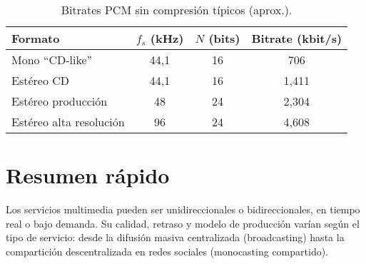 \documentclass[11pt,a4paper]{article}
\begin{document}
\begin{table}[h!]
\centering
\begin{tabular}{lccc}
\hline
\textbf{Formato} & $f_s$ (kHz) & $N$ (bits) & \textbf{Bitrate} (kbit/s) \\
\hline
Mono ``CD-like''     & 44{,}1 & 16 & 706 \\
Estéreo CD           & 44{,}1 & 16 & 1{,}411 \\
Estéreo producción   & 48     & 24 & 2{,}304 \\
Estéreo alta resolución & 96  & 24 & 4{,}608 \\
\hline
\end{tabular}
\caption{Bitrates PCM sin compresión típicos (aprox.).}
\end{table}


\section{Resumen rápido}

\begin{ResumenBox}
Los servicios multimedia pueden ser unidireccionales o bidireccionales, en tiempo real o bajo demanda. Su calidad, retraso y modelo de producción varían según el tipo de servicio: desde la difusión masiva centralizada (broadcasting) hasta la compartición descentralizada en redes sociales (monocasting compartido).
\end{ResumenBox}
\end{document}
